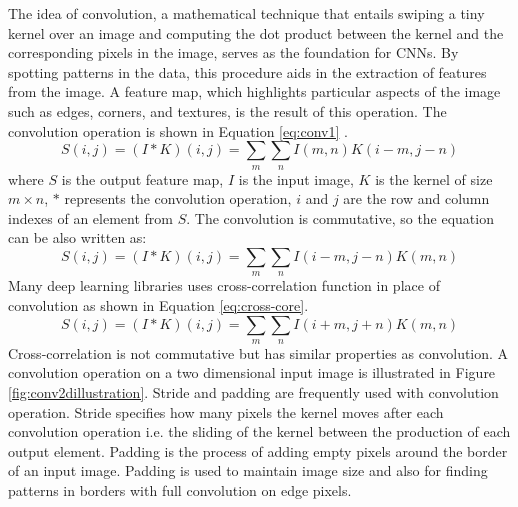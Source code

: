 The idea of convolution, a mathematical technique that entails swiping a tiny kernel over an image and computing the dot product between the kernel and the corresponding pixels in the image, serves as the foundation for CNNs. By spotting patterns in the data, this procedure aids in the extraction of features from the image. A feature map, which highlights particular aspects of the image such as edges, corners, and textures, is the result of this operation. The convolution operation is shown in Equation \ref{eq:conv1} \cite{Goodfellow-et-al-2016}.
\begin{equation}\label{eq:conv1}
	S(i, j)=(I * K)(i, j)=\sum_m \sum_n I(m, n) K(i-m, j-n)
\end{equation}
where $S$ is the output feature map, $I$ is the input image, $K$ is the kernel of size $m \times n$, $*$ represents the convolution operation, $i$ and $j$ are the row and column indexes of an element from $S$. The convolution is commutative, so the equation can be also written as:
\begin{equation}\label{eq:conv1}
	S(i, j)=(I * K)(i, j)=\sum_m \sum_n I(i-m, j-n) K(m,n)
\end{equation} 
Many deep learning libraries uses cross-correlation function in place of convolution as shown in Equation \ref{eq:cross-core}.
\begin{equation}\label{eq:cross-core}
	S(i, j)=(I * K)(i, j)=\sum_m \sum_n I(i+m, j+n) K(m,n)
\end{equation}
Cross-correlation is not commutative but has similar properties as convolution. A convolution operation on a two dimensional input image is illustrated in Figure \ref{fig:conv2dillustration}. Stride and padding are frequently used with convolution operation. Stride specifies how many pixels the kernel moves after each convolution operation i.e. the sliding of the kernel between the production of each output element. Padding is the process of adding empty pixels around the border of an input image. Padding is used to maintain image size and also for finding patterns in borders with full convolution on edge pixels.
